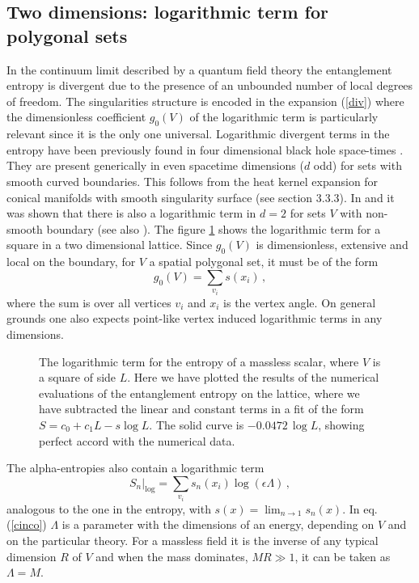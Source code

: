 \documentclass[a4paper]{article}
\begin{document}
\subsection{Two dimensions: logarithmic term for polygonal sets}
In the continuum limit described by a quantum field theory the entanglement entropy is divergent due to the presence of an unbounded number of local degrees of freedom.  The singularities structure is encoded in the expansion (\ref{div}) where the dimensionless coefficient $g_0(V)$ of the logarithmic term is particularly relevant since it is the only one universal. 
Logarithmic divergent terms in the entropy have been previously found in four dimensional black hole space-times \cite{dos}. They are present generically in even spacetime dimensions ($d$ odd) for sets with smooth curved boundaries. This follows from the heat kernel expansion for conical manifolds with smooth singularity surface (see section 3.3.3). 
In \cite{log} and \cite{log1} it was shown that there is also a logarithmic term in $d=2$ for sets $V$ with non-smooth boundary (see also \cite{frolovangulo,frad}). The figure \ref{haha} shows the logarithmic term for a square in a two dimensional lattice. 
Since $g_0(V)$ is dimensionless, extensive and local on the boundary, for $V$ a spatial polygonal set, it must be of the form
\begin{equation}
g_0(V)=\sum_{v_i} s(x_i)\,,
\end{equation}       
where the sum is over all vertices $v_i$ and  $x_i$ is the vertex angle. On general grounds one also expects point-like vertex induced logarithmic  terms in any dimensions.

\begin{figure} [tbp]
\centering
\leavevmode
\epsfysize=5.3cm
\bigskip
{}
\caption{The logarithmic term for the entropy of a massless scalar, where $V$ is a square of side $L$. Here we have plotted the results of the numerical evaluations of the entanglement entropy on the lattice, where we have subtracted the linear and constant terms in a fit of the form $S=c_0+c_1 L-s \log L$. The solid curve is $-0.0472\,\log L$, showing perfect accord with the numerical data.}
\label{haha}
\end{figure}

The alpha-entropies also contain a logarithmic term 
\begin{equation}
\left.S_n\right|_{\log}=\sum_{v_i} s_n(x_i) \log(\epsilon \Lambda)\,, \label{cinco}
\end{equation} 
analogous to the one in the entropy, with $
s(x)=\lim_{n\rightarrow 1} s_n(x)$.
In eq. (\ref{cinco}) $\Lambda$ is a parameter with the dimensions of an energy, depending on $V$ and on the particular  theory. For a massless field it is the inverse of any typical dimension $R$ of $V$ and when the mass dominates, $MR\gg 1$, it can be taken  as $\Lambda=M$. 
\end{document}
